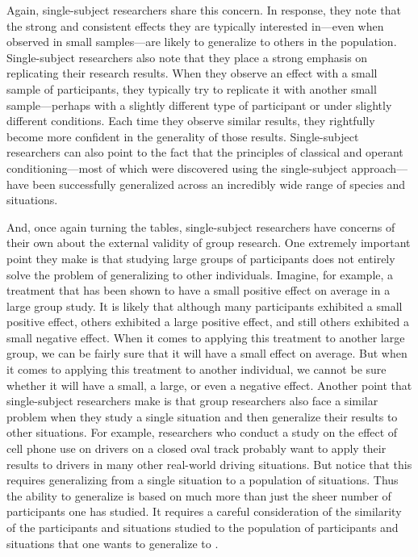  Again, single-subject researchers share this concern. In response, they note that the strong and consistent effects they are typically interested in---even when observed in small samples---are likely to generalize to others in the population. Single-subject researchers also note that they place a strong emphasis on replicating their research results. When they observe an effect with a small sample of participants, they typically try to replicate it with another small sample---perhaps with a slightly different type of participant or under slightly different conditions. Each time they observe similar results, they rightfully become more confident in the generality of those results. Single-subject researchers can also point to the fact that the principles of classical and operant conditioning---most of which were discovered using the single-subject approach---have been successfully generalized across an incredibly wide range of species and situations.

 And, once again turning the tables, single-subject researchers have concerns of their own about the external validity of group research. One extremely important point they make is that studying large groups of participants does not entirely solve the problem of generalizing to other individuals. Imagine, for example, a treatment that has been shown to have a small positive effect on average in a large group study. It is likely that although many participants exhibited a small positive effect, others exhibited a large positive effect, and still others exhibited a small negative effect. When it comes to applying this treatment to another large group, we can be fairly sure that it will have a small effect on average. But when it comes to applying this treatment to another individual, we cannot be sure whether it will have a small, a large, or even a negative effect. Another point that single-subject researchers make is that group researchers also face a similar problem when they study a single situation and then generalize their results to other situations. For example, researchers who conduct a study on the effect of cell phone use on drivers on a closed oval track probably want to apply their results to drivers in many other real-world driving situations. But notice that this requires generalizing from a single situation to a population of situations. Thus the ability to generalize is based on much more than just the sheer number of participants one has studied. It requires a careful consideration of the similarity of the participants and situations studied to the population of participants and situations that one wants to generalize to \citep{shadish_experimental_2002}.

